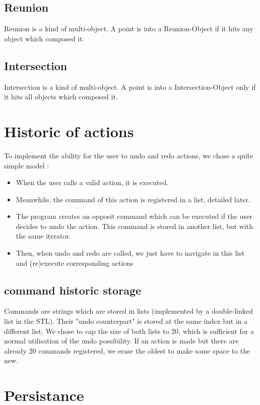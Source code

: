 \documentclass[a4paper, 12pts]{article}
\begin{document}
    \subsection{Reunion}
        Reunion is a kind of multi-object. A point is into a Reunion-Object if it hits any object which composed it.
    \subsection{Intersection}
        Intersection is a kind of multi-object. A point is into a Intersection-Object only if it hits all objects which composed it.

\section{Historic of actions}
    To implement the ability for the user to undo and redo actions, we chose a quite simple model :
    \begin{itemize}
        \item When the user calls a valid action, it is executed.
        \item Meanwhile, the command of this action is registered in a list, detailed later.
        \item The program creates an opposit command which can be executed if the user decides to undo the action.
        This command is stored in another list, but with the same iterator.
        \item Then, when undo and redo are called, we just have to navigate in this list and (re)execute corresponding
        actions
    \end{itemize}

    \subsection{command historic storage}
        Commands are strings which are stored in lists (implemented by a double-linked list in the STL). Their "undo
        counterpart" is stored at the same index but in a different list. We chose to cap the size of both lists to 20,
        which is sufficient for a normal utilisation of the undo possibility. If an action is made but there are
        already 20 commands registered, we erase the oldest to make some space to the new.

\section{Persistance}
\end{document}
